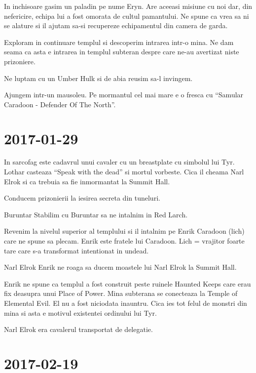 \documentclass[12pt,oneside]{book}
\begin{document}
In inchisoare gasim un paladin pe nume Eryn. Are aceeasi misiune cu noi dar, din nefericire, echipa lui a fost
omorata de cultul pamantului. Ne spune ca vrea sa ni se alature si il ajutam sa-si recupereze echipamentul din camera de garda.

Exploram in continuare templul si descoperim intrarea intr-o mina. Ne dam seama ca asta e intrarea in templul subteran despre
care ne-au avertizat niste prizoniere.

Ne luptam cu un Umber Hulk si de abia reusim sa-l invingem.

Ajungem intr-un mausoleu. Pe mormantul cel mai mare e o fresca cu ``Samular Caradoon - Defender Of The North''.


\section{2017-01-29}

In sarcofag este cadavrul unui cavaler cu un breastplate cu simbolul lui Tyr. Lothar casteaza ``Speak with the dead'' si
mortul vorbeste. Cica il cheama Narl Elrok si ca trebuia sa fie inmormantat la Summit Hall.

Conducem prizonierii la iesirea secreta din tuneluri.

\begin{rpg-paperbox}{Buruntar}
Stabilim cu Buruntar sa ne intalnim in Red Larch.
\end{rpg-paperbox}

Revenim la nivelul superior al templului si il intalnim pe Enrik Caradoon (lich) care ne spune sa plecam. Enrik este fratele
lui Caradoon. Lich = vrajitor foarte tare care s-a transformat intentionat in undead.

\begin{rpg-paperbox}{Narl Elrok}
	Enrik ne roaga sa ducem moastele lui Narl Elrok la Summit Hall.
\end{rpg-paperbox}

Enrik ne spune ca templul a fost construit peste ruinele Haunted Keeps care erau fix deasupra unui Place of Power. Mina subterana se conecteaza  la Temple of Elemental Evil. El nu  a fost niciodata inauntru. Cica ies tot felul de monstri din mina si asta e motivul existentei ordinului lui Tyr.

Narl Elrok era cavalerul transportat de delegatie.

\section{2017-02-19}
\end{document}
